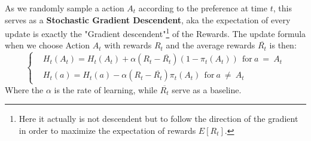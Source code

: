 \documentclass{article}
\begin{document}
As we randomly sample a action $A_t$ according to the preference at time $t$, this serves as a \textbf{Stochastic
Gradient Descendent}, aka the expectation of every update is exactly the "Gradient descendent"\footnote{Here it
actually is not descendent but to follow the direction of the gradient in order to maximize the expectation of
rewards $E[R_t]$.} of the Rewards. 
The update formula when we choose Action $A_t$ with rewards $R_t$ and the average rewards $\overline{R_t}$ is then:
\begin{equation}\label{eq:UpdateEq}
    \left\{\begin{aligned}
    &H_t(A_t) = H_t(A_t) + \alpha(R_t - \overline{R_t})(1-\pi_t(A_t)) ~~ \text{for}~ a ~= ~A_t\\
    &H_t(a) = H_t(a) - \alpha(R_t - \overline{R_t})\pi_t(A_t)~~ \text{for}~ a ~\neq ~A_t
    \end{aligned}\right.
\end{equation}
Where the $\alpha$ is the rate of learning, while $\overline{R_t}$ serve as a baseline. 
\end{document}
